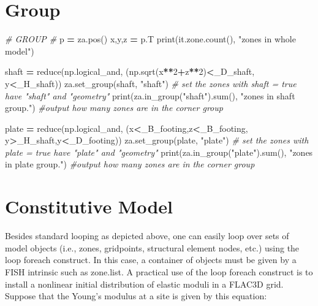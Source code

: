 \documentclass[a4paper, nobind]{templates/ociamthesis}
\newenvironment{Shaded}{\begin{snugshade}}{\end{snugshade}}
\newcommand{\BuiltInTok}[1]{#1}
\newcommand{\CommentTok}[1]{\textcolor[rgb]{0.56,0.35,0.01}{\textit{#1}}}
\newcommand{\DecValTok}[1]{\textcolor[rgb]{0.00,0.00,0.81}{#1}}
\newcommand{\NormalTok}[1]{#1}
\newcommand{\OperatorTok}[1]{\textcolor[rgb]{0.81,0.36,0.00}{\textbf{#1}}}
\newcommand{\StringTok}[1]{\textcolor[rgb]{0.31,0.60,0.02}{#1}}
\renewenvironment{Shaded}
{
  \vspace{10pt}%
  \begin{snugshade}%
}{%
  \end{snugshade}%
  \vspace{8pt}%
}
\begin{document}
\hypertarget{group}{%
\section{Group}\label{group}}

\begin{Shaded}
\begin{Highlighting}[]
\CommentTok{\# GROUP \#}
\NormalTok{p }\OperatorTok{=}\NormalTok{ za.pos()}
\NormalTok{x,y,z }\OperatorTok{=}\NormalTok{ p.T}
\BuiltInTok{print}\NormalTok{(it.zone.count(), }\StringTok{"zones in whole model"}\NormalTok{)}

\NormalTok{shaft }\OperatorTok{=} \BuiltInTok{reduce}\NormalTok{(np.logical\_and, (np.sqrt(x}\OperatorTok{**}\DecValTok{2}\OperatorTok{+}\NormalTok{z}\OperatorTok{**}\DecValTok{2}\NormalTok{)}\OperatorTok{\textless{}}\NormalTok{\_D\_shaft, y}\OperatorTok{\textless{}}\NormalTok{\_H\_shaft))}
\NormalTok{za.set\_group(shaft, }\StringTok{"shaft"}\NormalTok{) }\CommentTok{\# set the zones with shaft = true have "shaft" and "geometry"}
\BuiltInTok{print}\NormalTok{(za.in\_group(}\StringTok{"shaft"}\NormalTok{).}\BuiltInTok{sum}\NormalTok{(), }\StringTok{"zones in shaft group."}\NormalTok{) }\CommentTok{\#output how many zones are in the corner group}

\NormalTok{plate }\OperatorTok{=} \BuiltInTok{reduce}\NormalTok{(np.logical\_and, (x}\OperatorTok{\textless{}}\NormalTok{\_B\_footing,z}\OperatorTok{\textless{}}\NormalTok{\_B\_footing, y}\OperatorTok{\textgreater{}}\NormalTok{\_H\_shaft,y}\OperatorTok{\textless{}}\NormalTok{\_D\_footing))}
\NormalTok{za.set\_group(plate, }\StringTok{"plate"}\NormalTok{) }\CommentTok{\# set the zones with plate = true have "plate" and "geometry"}
\BuiltInTok{print}\NormalTok{(za.in\_group(}\StringTok{"plate"}\NormalTok{).}\BuiltInTok{sum}\NormalTok{(), }\StringTok{"zones in plate group."}\NormalTok{) }\CommentTok{\#output how many zones are in the corner group}
\end{Highlighting}
\end{Shaded}

\hypertarget{constitutive-model}{%
\section{Constitutive Model}\label{constitutive-model}}

Besides standard looping as depicted above, one can easily loop over
sets of model objects (i.e., zones, gridpoints, structural element
nodes, etc.) using the loop foreach construct. In this case, a container
of objects must be given by a FISH intrinsic such as zone.list. A
practical use of the loop foreach construct is to install a nonlinear
initial distribution of elastic moduli in a FLAC3D grid. Suppose that
the Young's modulus at a site is given by this equation:
\end{document}
